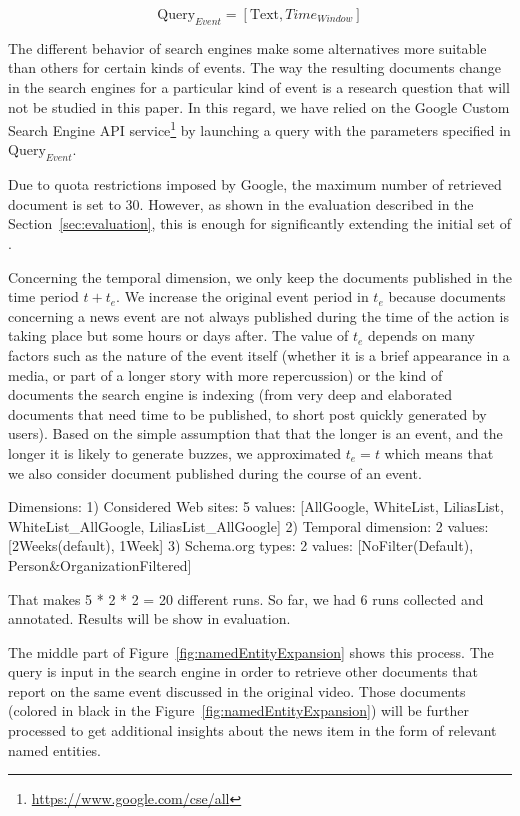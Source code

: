 \documentclass{llncs}
\begin{document}
\begin{equation}
\text{Query}_{Event} =\left [ \text{Text}, Time_{Window} \right ]
\end{equation}

The different behavior of search engines make some alternatives more suitable than others for certain kinds of events. The way the resulting documents change in the search engines for a particular kind of event is a research question that will not be studied in this paper. In this regard, we have relied on the Google Custom Search Engine API service\footnote{\fontsize{8pt}{1em}\selectfont  \url{https://www.google.com/cse/all}} by launching a query with the parameters specified in $\text{Query}_{Event}$. 

Due to quota restrictions imposed by Google, the maximum number of retrieved document is set to 30. However, as shown in the evaluation described in the Section~\ref{sec:evaluation}, this is enough for significantly extending the initial set of .

Concerning the temporal dimension, we only keep the documents published in the time period $t+t_{e}$. We increase the original event period in $t_{e}$ because documents concerning a news event are not always published during the time of the action is taking place but some hours or days after. The value of $t_{e}$ depends on many factors such as the nature of the event itself (whether it is a brief appearance in a media, or part of a longer story with more repercussion) or the kind of documents the search engine is indexing (from very deep and elaborated documents that need time to be published, to short post quickly generated by users). Based on the simple assumption that that the longer is an event, and the longer it is likely to generate buzzes, we approximated  $t_{e} = t$ which means that we also consider document published during the course of an event.


Dimensions:
1) Considered Web sites: 5 values: [AllGoogle, WhiteList, LiliasList, WhiteList\_AllGoogle, LiliasList\_AllGoogle]
2) Temporal dimension: 2 values: [2Weeks(default), 1Week]
3) Schema.org types: 2 values: [NoFilter(Default), Person\&OrganizationFiltered]

That makes 5 * 2 * 2 = 20 different runs. So far, we had 6 runs collected and annotated. Results will be show in evaluation.

The middle part of Figure~\ref{fig:namedEntityExpansion} shows this process. The query is input in the search engine in order to retrieve other documents that report on the same event discussed in the original video. Those documents (colored in black in the Figure~\ref{fig:namedEntityExpansion}) will be further processed to get additional insights about the news item in the form of relevant named entities.
\end{document}
